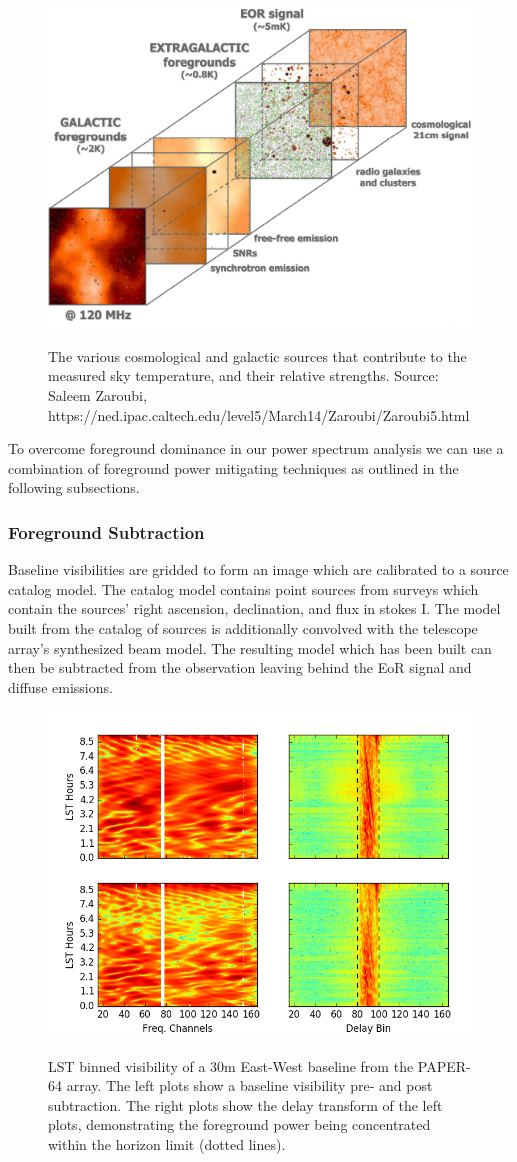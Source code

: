 \documentclass[a0,landscape]{a0poster}
\begin{document}
\begin{multicols}{4}
\begin{figure}[H]
\centering
\includegraphics[width=0.55\linewidth]{figures/foreground_figure.png}\\
\caption{The various cosmological and galactic sources that contribute to the measured sky temperature, and their relative strengths. Source: Saleem Zaroubi, https://ned.ipac.caltech.edu/level5/March14/Zaroubi/Zaroubi5.html}\label{fig:foregroundsrcs}
\end{figure}
To overcome foreground dominance in our power spectrum analysis we can use a combination of foreground power mitigating techniques as outlined in the following subsections.
\subsubsection*{Foreground Subtraction}
Baseline visibilities are gridded to form an image which are calibrated to a source catalog model. The catalog model contains point sources from surveys which contain the sources' right ascension, declination, and flux in stokes I. The model built from the catalog of sources is additionally convolved with the telescope array's synthesized beam model. The resulting model which has been built can then be subtracted from the observation leaving behind the EoR signal and diffuse emissions.
\begin{figure}[H]
\centering
\label{fig:foresubtract}
\includegraphics[width=0.6\linewidth]{figures/foresub.png}\\
\caption{LST binned visibility of a 30m East-West baseline from the PAPER-64 array. The left plots show a baseline visibility pre- and post subtraction. The right plots show the delay transform of the left plots, demonstrating the foreground power being concentrated within the horizon limit (dotted lines).}
\end{figure}



\end{multicols}
\end{document}
